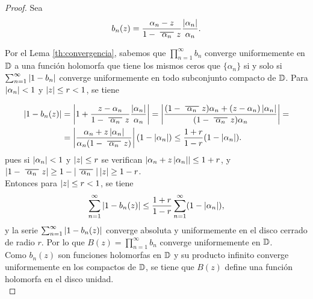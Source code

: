 \begin{proof}
    Sea
    \begin{equation*}
        b_n (z) = \frac{\alpha_n - z}{1 - \xbar{\alpha_n}z} \dfrac{\abs{\alpha_n}}{\alpha_n}.
    \end{equation*}

    Por el Lema \ref{th:convergencia}, sabemos que $\prod_{n=1}^{\infty} b_n$ converge uniformemente en $\mathbb{D}$ a una función holomorfa que tiene los mismos ceros que $\{\alpha_n\}$ si y solo si $\sum_{n=1}^{\infty} \left\lvert1 - b_n\right\rvert$ converge uniformemente en todo subconjunto compacto de $\mathbb{D}$. Para $\left\lvert\alpha_n\right\rvert < 1$ y $\left\lvert z\right\rvert \leq r < 1$, se tiene

    \begin{equation*}
        \begin{split}
            \abs{1 - b_n(z)} & = \abs{1 + \dfrac{z - \alpha_n}{1 - \xbar{\alpha_n}z} \dfrac{\abs{\alpha_n}}{\alpha_n}} = \abs{\dfrac{(1 - \xbar{\alpha_n}z) \alpha_n + (z - \alpha_n) \abs{\alpha_n}}{(1 - \xbar{\alpha_n}z) \alpha_n}} = \\
                             & = \abs{ \dfrac{\alpha_n + z \abs{\alpha_n}}{\alpha_n (1 - \xbar{\alpha_n}z)}} (1 - \abs{\alpha_n}) \leq \dfrac{1 + r}{1 - r} (1 - \abs{\alpha_n}).
        \end{split}
    \end{equation*}
    pues si $\left\lvert\alpha_n\right\rvert < 1$ y $\left\lvert z\right\rvert \leq r$ se verifican $\left\lvert\alpha_n + z \left\lvert\alpha_n\right\rvert\right\rvert \leq 1+r$, y $\abs{1- \xbar{\alpha_n}z} \geq 1-\abs{\xbar{\alpha_n}}\abs{z} \geq 1-r$. \\

    Entonces para $\left\lvert z\right\rvert \leq r < 1$, se tiene
    \begin{equation*}
        \sum_{n=1}^{\infty} \left\lvert1 - b_n(z)\right\rvert \leq \dfrac{1 + r}{1 - r} \sum_{n=1}^{\infty} (1 - \left\lvert\alpha_n\right\rvert),
    \end{equation*}
    y la serie $\sum_{n=1}^{\infty} \left\lvert1 - b_n(z)\right\rvert$ converge absoluta y uniformemente en el disco cerrado de radio $r$. Por lo que $B(z) = \prod_{n=1}^{\infty} b_n$ converge uniformemente en $\mathbb{D}$. \\

    Como $b_n(z)$ son funciones holomorfas en $\mathbb{D}$ y su producto infinito converge uniformemente en los compactos de $\mathbb{D}$, se tiene que $B(z)$ define una función holomorfa en el disco unidad. \\ %


\end{proof}
